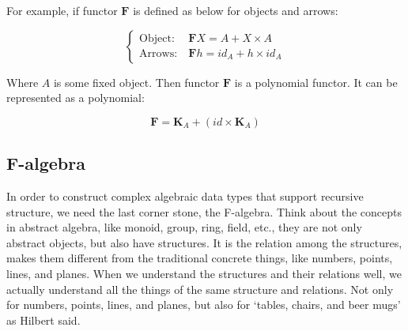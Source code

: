 \documentclass[b5paper]{article}
\begin{document}
For example, if functor $\mathbf{F}$ is defined as below for objects and arrows:

\[
\begin{cases}
\text{Object:}\ & \mathbf{F} X = A + X \times A \\
\text{Arrows:}\ & \mathbf{F} h = id_A + h \times id_A
\end{cases}
\]

Where $A$ is some fixed object. Then functor $\mathbf{F}$ is a polynomial functor. It can be represented as a polynomial:

\[
\mathbf{F} = \mathbf{K}_A + (id \times \mathbf{K}_A)
\]

\subsection{F-algebra}

In order to construct complex algebraic data types that support recursive structure, we need the last corner stone, the F-algebra. Think about the concepts in abstract algebra, like monoid, group, ring, field, etc., they are not only abstract objects, but also have structures. It is the relation among the structures, makes them different from the traditional concrete things, like numbers, points, lines, and planes. When we understand the structures and their relations well, we actually understand all the things of the same structure and relations. Not only for numbers, points, lines, and planes, but also for `tables, chairs, and beer mugs' as Hilbert said.
\end{document}
